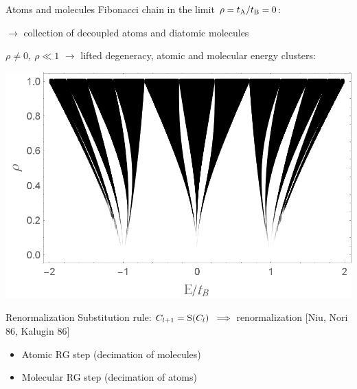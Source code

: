 \begin{frame}{Atoms and molecules}
Fibonacci chain in the limit $\rho = t_{\text{A}}/t_{\text{B}} = 0$:

{\centering


}

$\to$ collection of decoupled atoms and diatomic molecules

$\rho \neq 0,~\rho \ll 1$ $\to$ lifted degeneracy, atomic and molecular energy clusters:

{\centering
\includegraphics[width=.4\textwidth]{img/3_part2/fibonacci_spectra_varying_rho}

}

\end{frame}

\begin{frame}{Renormalization}
Substitution rule: $C_{l+1} = \operatorname{S}(C_l)$ $\implies$ renormalization [Niu, Nori 86, Kalugin \etal{} 86]
	\begin{itemize}
	\item Atomic RG step (decimation of molecules) 
	
	{\centering
	
	}
	
	\item Molecular RG step (decimation of atoms) 
	
	{\centering
	
	}
	
	\end{itemize}

\end{frame}

